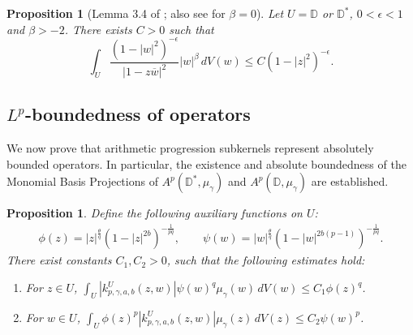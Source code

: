 \documentclass[letterpaper,11pt,reqno]{amsart}
\theoremstyle{plain}
\newtheorem{proposition}[equation]{Proposition}
\theoremstyle{definition}
\theoremstyle{remark}
\theoremstyle{remark}
\numberwithin{equation}{section}
\newcommand{\abs}[1]{\left\vert#1\right\vert}
\newcommand{\ol}{\overline}
\newcommand{\mug}{{\mu_{\gamma}}}
\newcommand{\D}{{\mathbb D}}
\begin{document}
\begin{proposition}[Lemma 3.4 of \cite{EdhMcN16}; also see \cite{ForRud74} for  $\beta = 0$]\label{P:standard-Bergman-disc-estimate}
Let $U=\D$ or $\D^*$,  $0<\epsilon <1$ and $\beta> -2$. There exists $C>0$ such that
\begin{equation}
\int_U \frac{(1-|w|^2)^{-\epsilon}}{|1-z\ol{w}|^2}|w|^{\beta}\,dV(w) \le C (1-|z|^2)^{-\epsilon}.
\end{equation}
\end{proposition}

\subsection{\texorpdfstring{$L^p$}{lp}-boundedness of operators}\label{SS:Lp-bounded-operators}

We now prove that arithmetic progression subkernels represent absolutely bounded operators. 
In particular, the existence and absolute boundedness of the Monomial Basis Projections of $A^p(\D^*,\mug)$ and $A^p(\D,\mug)$ are established.

\begin{proposition}\label{P:abs-boundedness-arith-prog-operators}
Define the following auxiliary functions on $U$:
\begin{align*}
\phi(z) = |z|^{\frac{\theta}{q}}(1-|z|^{2b})^{-\frac{1}{pq}}, \qquad  
\psi(w) = |w|^{\frac{\theta}{q}}(1-|w|^{2b(p-1)})^{-\frac{1}{pq}}.
\end{align*}
There exist constants $C_1, C_2>0$, such that the following estimates hold:
\begin{enumerate}
\item For $z\in U$, $\displaystyle{\int_{U} \abs{k^{U}_{p,\gamma,a,b}(z,w)}  \psi(w)^q \mug(w)\, dV(w) \le C_1 \phi(z)^q}$. \label{E:arith-kern-est1} \\
\item For $w\in U$, $\displaystyle{\int_{U} \phi(z)^p\abs{k^{U}_{p,\gamma,a,b}(z,w)}  \mug(z)\, dV(z) \le C_2 \psi(w)^p}$. \label{E:arith-kern-est2}
\end{enumerate}
\end{proposition}
\end{document}

